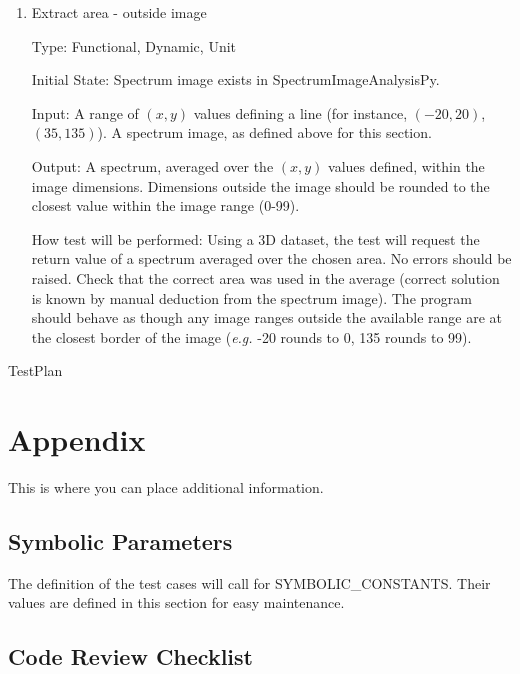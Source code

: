 \documentclass[12pt, titlepage]{article}
\newcommand{\progname}{SpectrumImageAnalysisPy}
\begin{document}
\begin{enumerate}
\item{Extract area - outside image}

Type: Functional, Dynamic, Unit

Initial State: Spectrum image exists in \progname{}.

Input: A range of $(x,y)$ values defining a line (for instance, $(-20, 20)$, $(35, 135)$). A spectrum image, as defined above for this section.

Output: A spectrum, averaged over the $(x,y)$ values defined, within the image dimensions. Dimensions outside the image should be rounded to the closest value within the image range (0-99).

How test will be performed: Using a 3D dataset, the test will request the return value of a spectrum averaged over the chosen area.  No errors should be raised. Check that the correct area was used in the average (correct solution is known by manual deduction from the spectrum image). The program should behave as though any image ranges outside the available range are at the closest border of the image (\textit{e.g.} -20 rounds to 0, 135 rounds to 99).

\end{enumerate}

 {TestPlan}

\newpage

\section{Appendix}

This is where you can place additional information.

\subsection{Symbolic Parameters}

The definition of the test cases will call for SYMBOLIC\_CONSTANTS.
Their values are defined in this section for easy maintenance.

\subsection{Code Review Checklist}
\end{document}
